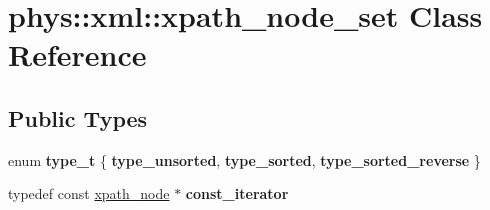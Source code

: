 \hypertarget{classphys_1_1xml_1_1xpath__node__set}{
\section{phys::xml::xpath\_\-node\_\-set Class Reference}
\label{d0/d0a/classphys_1_1xml_1_1xpath__node__set}
}
\subsection*{Public Types}
\begin{DoxyCompactItemize}
\item 
enum {\bfseries type\_\-t} \{ {\bfseries type\_\-unsorted}, 
{\bfseries type\_\-sorted}, 
{\bfseries type\_\-sorted\_\-reverse}
 \}
\item 
\hypertarget{classphys_1_1xml_1_1xpath__node__set_a31a6cf912b89b7d77e9e50ba5ae0413e}{
typedef const \hyperlink{classphys_1_1xml_1_1xpath__node}{xpath\_\-node} $\ast$ {\bfseries const\_\-iterator}}
\label{d0/d0a/classphys_1_1xml_1_1xpath__node__set_a31a6cf912b89b7d77e9e50ba5ae0413e}

\end{DoxyCompactItemize}
